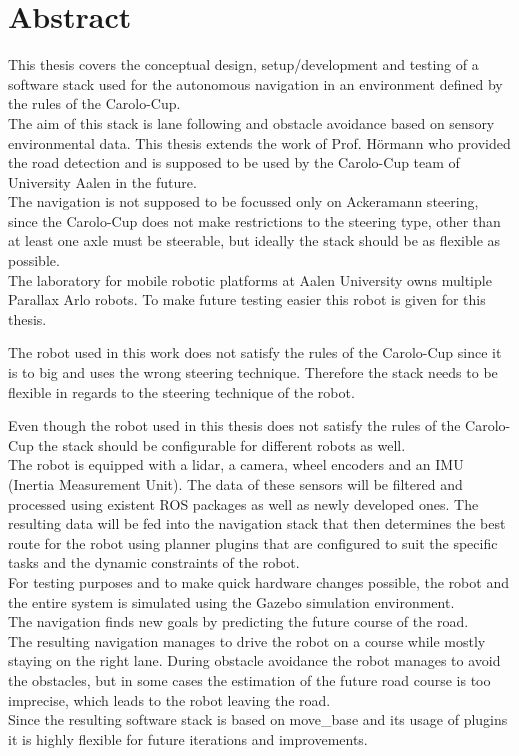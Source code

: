\chapter*{Abstract}
\label{abstract}
This thesis covers the conceptual design, setup/development and testing of a software stack used for the autonomous navigation in an environment defined by the rules of the Carolo-Cup.\\

 The aim of this stack is lane following and obstacle avoidance based on sensory environmental data. This thesis extends the work of Prof. Hörmann who provided the road detection and is supposed to be used by the Carolo-Cup team of University Aalen in the future.\\
 
 The navigation is not supposed to be focussed only on Ackeramann steering, since the Carolo-Cup does not make restrictions to the steering type, other than at least one axle must be steerable, but ideally the stack should be as flexible as possible\cite{carolocup}.\\
 The laboratory for mobile robotic platforms at Aalen University owns multiple Parallax Arlo robots. To make future testing easier this robot is given for this thesis.

 The robot used in this work does not satisfy the rules of the Carolo-Cup since it is to big and uses the wrong steering technique. Therefore the stack needs to be flexible in regards to the steering technique of the robot.
 
 Even though the robot used in this thesis does not satisfy the rules of the Carolo-Cup the stack should be configurable for different robots as well.\\

The robot is equipped with a lidar, a camera, wheel encoders and an IMU (Inertia Measurement Unit). The data of these sensors will be filtered and processed using existent ROS packages as well as newly developed ones. The resulting data will be fed into the navigation stack that then determines the best route for the robot using planner plugins that are configured to suit the specific tasks and the dynamic constraints of the robot.\\

For testing purposes and to make quick hardware changes possible, the robot and the entire system is simulated using the Gazebo simulation environment.\\

The navigation finds new goals by predicting the future course of the road.\\

The resulting navigation manages to drive the robot on a course while mostly staying on the right lane. During obstacle avoidance the robot manages to avoid the obstacles, but in some cases the estimation of the future road course is too imprecise, which leads to the robot leaving the road.\\

Since the resulting software stack is based on move\_base and its usage of plugins it is highly flexible for future iterations and improvements.\\